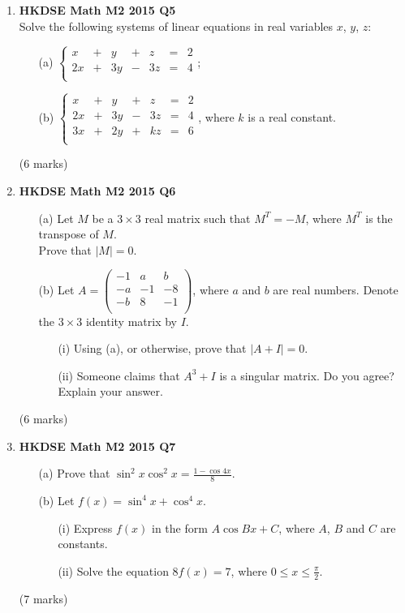 \documentclass[12pt]{article}
\begin{document}
\begin{enumerate}
	\item \textbf{HKDSE Math M2 2015 Q5}\\
	Solve the following systems of linear equations in real variables $x$, $y$, $z$:
	\begin{enumerate}
		\item [(a)]$\left\{
			\begin{matrix}
				x&+&y&+&z&=&2\\
				2x&+&3y&-&3z&=&4\\
			\end{matrix}\right.$;
		\item [(b)]$\left\{
			\begin{matrix}
				x&+&y&+&z&=&2\\
				2x&+&3y&-&3z&=&4\\
				3x&+&2y&+&kz&=&6\\
			\end{matrix}\right.$, where $k$ is a real constant.
	\end{enumerate}
	(6 marks)

	\item \textbf{HKDSE Math M2 2015 Q6}
	\begin{enumerate}
		\item [(a)]Let $M$ be a $3 \times 3$ real matrix such that $M^T = -M$, where $M^T$ is the transpose of $M$.\\
		Prove that $|M| = 0$.
		\item [(b)]Let $A = \begin{pmatrix}
			-1&a&b\\
			-a&-1&-8\\
			-b&8&-1\\
		\end{pmatrix}$, where $a$ and $b$ are real numbers. Denote the $3 \times 3$ identity matrix by $I$.
		\begin{enumerate}
			\item [(i)]Using (a), or otherwise, prove that $|A+I| = 0$. 
			\item [(ii)]Someone claims that $A^3 + I$ is a singular matrix. Do you agree? Explain your answer.
		\end{enumerate}
	\end{enumerate}
	(6 marks)

	\item \textbf{HKDSE Math M2 2015 Q7}
	\begin{enumerate}
		\item [(a)]Prove that $\sin^2{x}\cos^2{x} = \displaystyle\frac{1 - \cos{4x}}{8}$. 
		\item [(b)]Let $f(x) = \sin^4{x} + \cos^4{x}$. 
		\begin{enumerate}
			\item [(i)]Express $f(x)$ in the form $A\cos{Bx} + C$, where $A$, $B$ and $C$ are constants.
			\item [(ii)]Solve the equation $8f(x) = 7$, where $ 0\leq  x \leq \displaystyle\frac{\pi}{2}$.
		\end{enumerate}
	\end{enumerate}
	(7 marks)


\end{enumerate}
\end{document}
